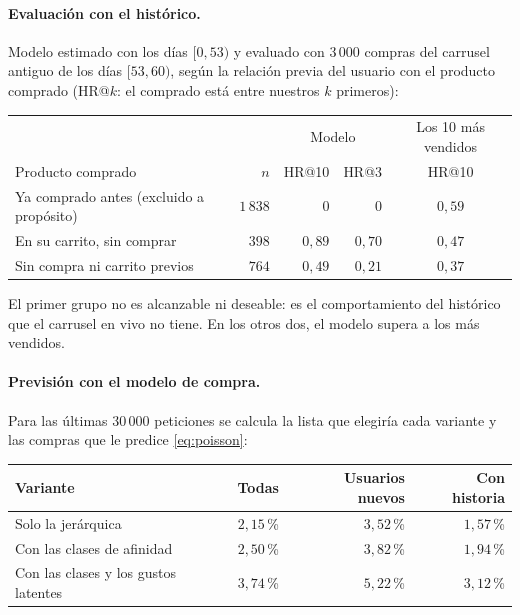 \documentclass[11pt,a4paper]{article}
\begin{document}
\paragraph{Evaluación con el histórico.} Modelo estimado con los días $[0,53)$ y evaluado con $3\,000$
compras del carrusel antiguo de los días $[53,60)$, según la relación previa del usuario con el
producto comprado (HR@$k$: el comprado está entre nuestros $k$ primeros):

\begin{center}
\small
\begin{tabular}{lrrrc}
\toprule
 & & \multicolumn{2}{c}{Modelo} & Los 10 más vendidos\\
Producto comprado & $n$ & HR@10 & HR@3 & HR@10\\
\midrule
Ya comprado antes (excluido a propósito) & $1\,838$ & $0$ & $0$ & $0{,}59$\\
En su carrito, sin comprar & $398$ & $0{,}89$ & $0{,}70$ & $0{,}47$\\
Sin compra ni carrito previos & $764$ & $0{,}49$ & $0{,}21$ & $0{,}37$\\
\bottomrule
\end{tabular}
\end{center}

El primer grupo no es alcanzable ni deseable: es el comportamiento del histórico que el carrusel en
vivo no tiene. En los otros dos, el modelo supera a los más vendidos.

\paragraph{Previsión con el modelo de compra.} Para las últimas $30\,000$ peticiones se calcula la lista
que elegiría cada variante y las compras que le predice \eqref{eq:poisson}:

\begin{center}
\small
\begin{tabular}{lrrr}
\toprule
Variante & Todas & Usuarios nuevos & Con historia\\
\midrule
Solo la jerárquica & $2{,}15$\,\% & $3{,}52$\,\% & $1{,}57$\,\%\\
Con las clases de afinidad & $2{,}50$\,\% & $3{,}82$\,\% & $1{,}94$\,\%\\
Con las clases y los gustos latentes & $3{,}74$\,\% & $5{,}22$\,\% & $3{,}12$\,\%\\
\bottomrule
\end{tabular}
\end{center}
\end{document}
